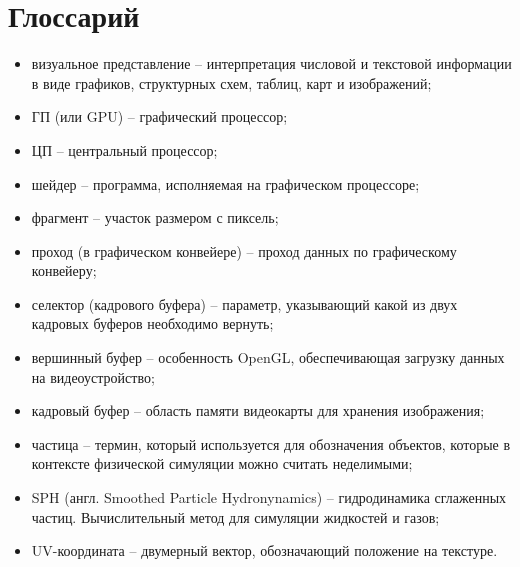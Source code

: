 \newpage
\section{Глоссарий}

\begin{itemize}
  \item визуальное представление -- интерпретация числовой и текстовой информации в 
    виде графиков, структурных схем, таблиц, карт и изображений;
  \item ГП (или GPU) -- графический процессор;
  \item ЦП -- центральный процессор;
  \item шейдер -- программа, исполняемая на графическом процессоре;
  \item фрагмент -- участок размером с пиксель;
  \item проход (в графическом конвейере) -- проход данных по графическому конвейеру;
  \item селектор (кадрового буфера) -- параметр, указывающий какой из двух кадровых буферов
    необходимо вернуть;
  \item вершинный буфер -- особенность OpenGL, обеспечивающая загрузку данных на видеоустройство;
  \item кадровый буфер -- область памяти видеокарты для хранения изображения;
  \item частица -- термин, который используется для обозначения объектов, которые в 
    контексте физической симуляции можно считать неделимыми;
  \item SPH (англ. Smoothed Particle Hydronynamics) -- гидродинамика сглаженных частиц. 
    Вычислительный метод для симуляции жидкостей и газов;
  \item UV-координата -- двумерный вектор, обозначающий положение на текстуре.
\end{itemize}
